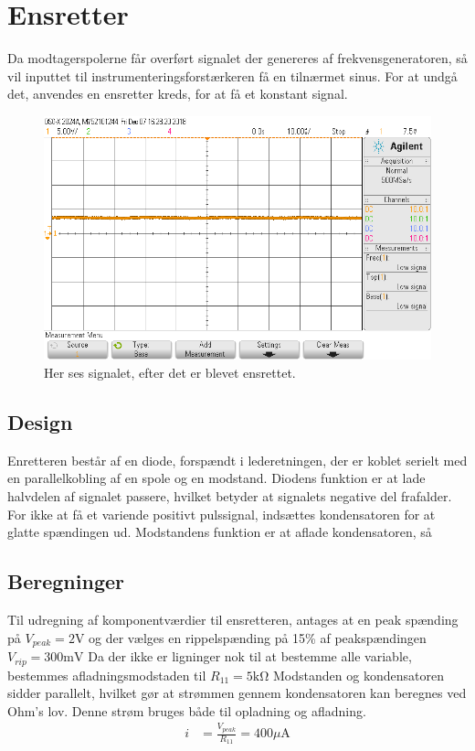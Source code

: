 \section{Ensretter}\label{sec:ensretter}
Da modtagerspolerne får overført signalet der genereres af frekvensgeneratoren, så vil inputtet til instrumenteringsforstærkeren få en tilnærmet sinus. 
For at undgå det, anvendes en ensretter kreds, for at få et konstant signal.
\begin{figure}[h!]
	\centering
	\includegraphics[width=1\textwidth]{billeder/ensretter_png.png}
	\caption{Her ses signalet, efter det er blevet ensrettet.}
	\label{fig:filter_out}
\end{figure}

\subsection{Design}
Enretteren består af en diode, forspændt i lederetningen, der er koblet serielt med en parallelkobling af en spole og en modstand. 
Diodens funktion er at lade halvdelen af signalet passere, hvilket betyder at signalets negative del frafalder. 
For ikke at få et variende positivt pulssignal, indsættes kondensatoren for at glatte spændingen ud. Modstandens funktion er at aflade kondensatoren, så



\subsection{Beregninger}
Til udregning af komponentværdier til ensretteren, antages at en peak spænding på $V_{peak} = 2\si{\volt}$ og der vælges en rippelspænding på 15\% af peakspændingen $V_{rip} = 300 \si{\milli\volt}$
Da der ikke er ligninger nok til at bestemme alle variable, bestemmes afladningsmodstaden til $R_{11} = 5 \si{\kilo\ohm}$
Modstanden og kondensatoren sidder parallelt, hvilket gør at strømmen gennem kondensatoren kan beregnes ved Ohm's lov. Denne strøm bruges både til opladning og afladning.
\begin{align}
	i & = \frac{V_{peak}}{R_{11}} = 400 \si{\mu\ampere}
\end{align}

